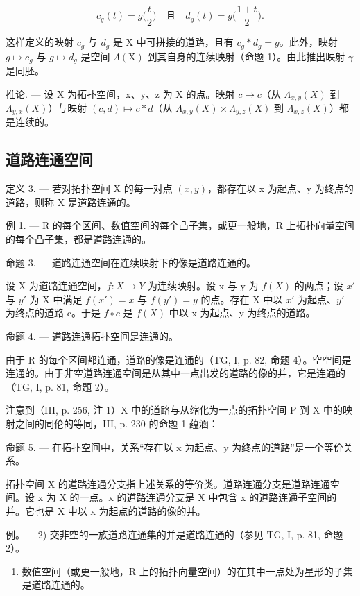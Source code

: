 \[
c _ {g} (t) = g \bigl (\frac {t}{2} \bigr) \quad \text{且} \quad d _ {g} (t) = g \bigl (\frac {1 + t}{2} \bigr).
\]

这样定义的映射 \(c_{g}\) 与 \(d_{g}\) 是 X 中可拼接的道路，且有 \(c_{g} * d_{g} = g\)。此外，映射 \(g \mapsto c_{g}\) 与 \(g \mapsto d_{g}\) 是空间 \(\Lambda(\mathrm{X})\) 到其自身的连续映射（命题 1）。由此推出映射 \(\gamma\) 是同胚。

推论. --- 设 X 为拓扑空间，x、y、z 为 X 的点。映射 \(c \mapsto \overline{c}\)（从 \(\Lambda_{x,y}(X)\) 到 \(\Lambda_{y,x}(X)\)）与映射 \((c,d) \mapsto c * d\)（从 \(\Lambda_{x,y}(X) \times \Lambda_{y,z}(X)\) 到 \(\Lambda_{x,z}(X)\)）都是连续的。

\subsection{道路连通空间}

定义 3. --- 若对拓扑空间 X 的每一对点 \((x,y)\)，都存在以 x 为起点、y 为终点的道路，则称 X 是道路连通的。

例 1. --- R 的每个区间、数值空间的每个凸子集，或更一般地，R 上拓扑向量空间的每个凸子集，都是道路连通的。

命题 3. --- 道路连通空间在连续映射下的像是道路连通的。

设 X 为道路连通空间，\(f: X \to Y\) 为连续映射。设 x 与 y 为 \(f(X)\) 的两点；设 \(x'\) 与 \(y'\) 为 X 中满足 \(f(x') = x\) 与 \(f(y') = y\) 的点。存在 X 中以 \(x'\) 为起点、\(y'\) 为终点的道路 c。于是 \(f \circ c\) 是 \(f(X)\) 中以 x 为起点、y 为终点的道路。

命题 4. --- 道路连通拓扑空间是连通的。

由于 R 的每个区间都连通，道路的像是连通的（TG, I, p. 82, 命题 4）。空空间是连通的。由于非空道路连通空间是从其中一点出发的道路的像的并，它是连通的（TG, I, p. 81, 命题 2）。

注意到（III, p. 256, 注 1）X 中的道路与从缩化为一点的拓扑空间 P 到 X 中的映射之间的同伦的等同，III, p. 230 的命题 1 蕴涵：

命题 5. --- 在拓扑空间中，关系“存在以 x 为起点、y 为终点的道路”是一个等价关系。

拓扑空间 X 的道路连通分支指上述关系的等价类。道路连通分支是道路连通空间。设 x 为 X 的一点。x 的道路连通分支是 X 中包含 x 的道路连通子空间的并。它也是 X 中以 x 为起点的道路的像的并。

例。--- 2) 交非空的一族道路连通集的并是道路连通的（参见 TG, I, p. 81, 命题 2）。

\begin{enumerate}
\def\labelenumi{\arabic{enumi})}
\setcounter{enumi}{2}
\tightlist
\item
  数值空间（或更一般地，R 上的拓扑向量空间）的在其中一点处为星形的子集是道路连通的。
\end{enumerate}

